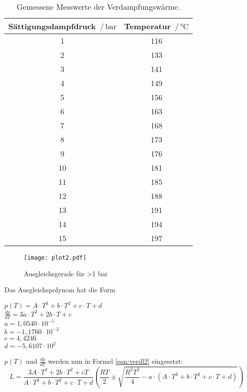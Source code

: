 \begin{table}[H]
  \centering
  \caption{Gemessene Messwerte der Verdampfungswärme.}
  \label{tab:werte1}
  \begin{tabular}{c c}
    \toprule
    Sättigungsdampfdruck $\,/\,\si{\bar}$ & Temperatur $\,/\, \si{\celsius}$ \\
    \midrule
    1 & 116 \\
    2 & 133 \\
    3 & 141 \\
    4 & 149 \\
    5 & 156 \\
    6 & 163 \\
    7 & 168 \\
    8 & 173 \\
    9 & 176 \\
    10 & 181 \\
    11 & 185 \\
    12 & 188 \\
    13 & 191 \\
    14 & 194 \\
    15 & 197 \\
    \bottomrule
  \end{tabular}
\end{table}

\begin{figure}
  \centering
  \texttt{[image: plot2.pdf]}
  \caption{Ausgleichsgerade für >1 bar}
  \label{fig:plot2}
\end{figure}
Das Ausgleichspolynom hat die Form
\begin{center}
  $p(T)= A \cdot T^3 + b \cdot T^2 + c \cdot T + d$ \\
  $\frac{dp}{dT} = 3a \cdot T^2 + 2b \cdot T + c$ \\
  $a = 1,0540 \cdot 10^{-5}$  \\
  $b = -1,1760 \cdot 10^{-2}$ \\
  $c = 4,4246$ \\
  $d = -5,6107 \cdot 10^2$ \\
\end{center}
$p(T)$ und $\frac{dp}{dT}$ werden nun in Formel \autoref{eqn:verdl2} eingesetzt:
\begin{equation*}
  L = \frac{3A \cdot T^3 + 2b \cdot T^2 + cT}{A \cdot T^3 + b \cdot T^2 + c \cdot T + d} \left(\frac{RT}{2} \pm \sqrt{\frac{R^2T^2}{4}-a\cdot(A \cdot T^3 + b \cdot T^2 + c \cdot T + d)}\right)
\end{equation*}